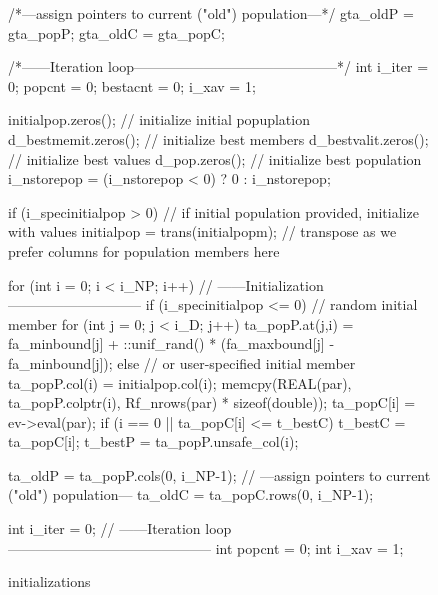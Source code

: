 \documentclass[nojss,shortnames,article]{jss}
\begin{document}
\begin{sidewaysfigure}
\begin{minipage}{0.56\linewidth}
    \begin{CodeChunk}
      \begin{CodeInput}

  /*---assign pointers to current ("old") population---*/
  gta_oldP = gta_popP;
  gta_oldC = gta_popC;
  
  /*------Iteration loop--------------------------------------------*/
  int i_iter = 0;
  popcnt = 0;
  bestacnt = 0;
  i_xav = 1;
      \end{CodeInput}
    \end{CodeChunk}

    \normalsize 
    \tiny 

    \bigskip
    \phantom{XX}
    \bigskip
    \phantom{XX}
    \bigskip
    \phantom{XX}
    \bigskip


    \begin{CodeChunk}
      \begin{CodeInput}
    initialpop.zeros();                         // initialize initial popuplation 
    d_bestmemit.zeros();                        // initialize best members
    d_bestvalit.zeros();                        // initialize best values 
    d_pop.zeros();                              // initialize best population
    i_nstorepop = (i_nstorepop < 0) ? 0 : i_nstorepop;
      
    if (i_specinitialpop > 0) {                 // if initial population provided, initialize with values 
        initialpop = trans(initialpopm);        // transpose as we prefer columns for population members here
    }

    for (int i = 0; i < i_NP; i++) {            // ------Initialization-----------------------------
        if (i_specinitialpop <= 0) {            // random initial member 
            for (int j = 0; j < i_D; j++) {
                ta_popP.at(j,i) = fa_minbound[j] + ::unif_rand() * (fa_maxbound[j] - fa_minbound[j]);
            }
        } else {                                // or user-specified initial member 
            ta_popP.col(i) = initialpop.col(i);
        } 
        memcpy(REAL(par), ta_popP.colptr(i), Rf_nrows(par) * sizeof(double));      
        ta_popC[i] = ev->eval(par);
        if (i == 0 || ta_popC[i] <= t_bestC) {
            t_bestC = ta_popC[i];
            t_bestP = ta_popP.unsafe_col(i);
        }
    }

    ta_oldP = ta_popP.cols(0, i_NP-1);          // ---assign pointers to current ("old") population---
    ta_oldC = ta_popC.rows(0, i_NP-1);
  
    int i_iter = 0;                             // ------Iteration loop--------------------------------------------
    int popcnt = 0;
    int i_xav = 1;
      \end{CodeInput}
    \end{CodeChunk}
    
    \normalsize 
  \end{minipage}
  \caption{ initializations}
  \label{fig:deoptim_end}
\end{sidewaysfigure}
\end{document}

